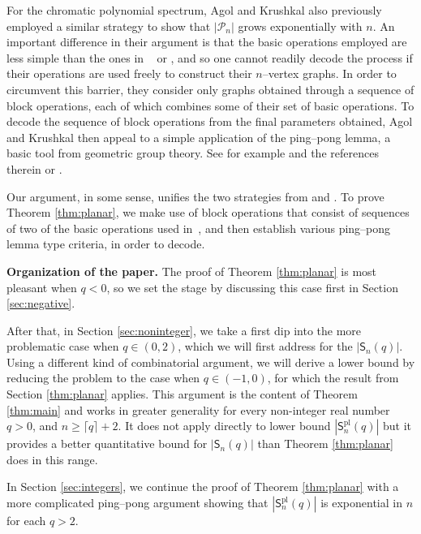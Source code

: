 \documentclass[A4paper,reqno,oneside,12pt]{amsart}
\theoremstyle{plain}
\theoremstyle{definition}
\DeclareMathOperator{\pl}{\mathrm{pl}}
\begin{document}
For the chromatic polynomial spectrum, Agol and Krushkal \cite{AKTutte} also previously employed a similar strategy to show that $|\mathcal{P}_n|$ grows exponentially with $n$. An important difference in their argument is that the basic operations employed are less simple than the ones in ~\cite{ABG} or \cite{ChanKontorovichPak24trees}, and so one cannot readily decode the process if their operations are used freely to construct their $n$--vertex graphs. In order to circumvent this barrier, they consider only graphs obtained through a sequence of block operations, each of which combines some of their set of basic operations. To decode the sequence of block operations from the final parameters obtained, Agol and Krushkal then appeal to a simple application of the ping--pong lemma, a basic tool from geometric group theory. See for example \cite{Loh} and the references therein or \cite{BrennerCharnow78}.

Our argument, in some sense, unifies the two strategies from \cite{AKTutte} and \cite{ABG}. To prove Theorem \ref{thm:planar}, we make use of block operations that consist of sequences of two of the basic operations used in~\cite{ABG}, and then establish various ping--pong lemma type criteria, in order to decode.

\vspace{+2mm}

\noindent\textbf{Organization of the paper.} The proof of Theorem \ref{thm:planar} is most pleasant when $q<0$, so we set the stage by discussing this case first in Section \ref{sec:negative}.

After that, in Section \ref{sec:noninteger}, we take a first dip into the more problematic case when $q \in (0,2)$, which we will first address for the $|\mathsf{S}_n(q)|$. Using a different kind of combinatorial argument, we will derive a lower bound by reducing the problem to the case when $q \in (-1,0)$, for which the result from Section \ref{thm:planar} applies. This argument is the content of Theorem \ref{thm:main} and works in greater generality for every non-integer real number $q > 0$, and $n\ge \lceil q\rceil+2$. It does not apply directly to lower bound $|\mathsf{S}^{\pl}_n(q)|$ but it provides a better quantitative bound for $|\mathsf{S}_n(q)|$ than Theorem \ref{thm:planar} does in this range. 

In Section \ref{sec:integers}, we continue the proof of Theorem \ref{thm:planar} with a more complicated ping--pong argument showing that $|\mathsf{S}^{\pl}_n(q)|$ is exponential in $n$ for each $q >2$. 
\end{document}
